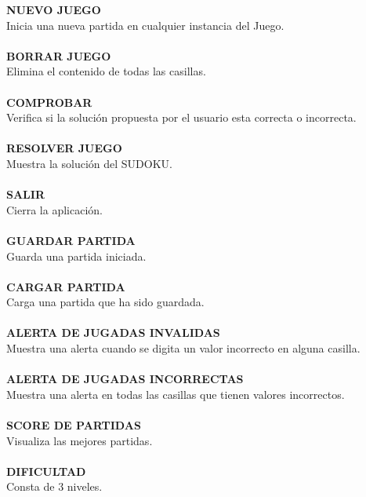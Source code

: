 \begin{center}
\textbf{NUEVO JUEGO} 
\\ Inicia una nueva partida en cualquier instancia del Juego.
\ \\ \ \\

\textbf{BORRAR JUEGO} 
\\ Elimina el contenido de todas las casillas. \ \\ \ \\

\textbf{COMPROBAR} 
\\ Verifica si la solución propuesta por el usuario esta correcta o incorrecta. 
\ \\ \ \\

\textbf{RESOLVER JUEGO}  
\\ Muestra la solución del SUDOKU. 
\ \\ \ \\

\textbf{SALIR}  
\\ Cierra la aplicación. 
\ \\ \ \\ 

\textbf{GUARDAR PARTIDA}  
\\ Guarda una partida iniciada. 
\ \\ \ \\ 

\textbf{CARGAR PARTIDA}  
\\ Carga una partida que ha sido guardada. 
\ \\ \ \\ 

\textbf{ALERTA DE JUGADAS INVALIDAS}  
\\ Muestra una alerta cuando se digita un valor incorrecto en alguna casilla. 
\ \\ \ \\ 

\textbf{ALERTA DE JUGADAS INCORRECTAS}  
\\ Muestra una alerta en todas las casillas que tienen valores incorrectos. 
\ \\ \ \\ 

\textbf{SCORE DE PARTIDAS}  
\\ Visualiza las mejores partidas. 
\ \\ \ \\ 

\textbf{DIFICULTAD} 
\\ Consta de 3 niveles.
\end{center}

